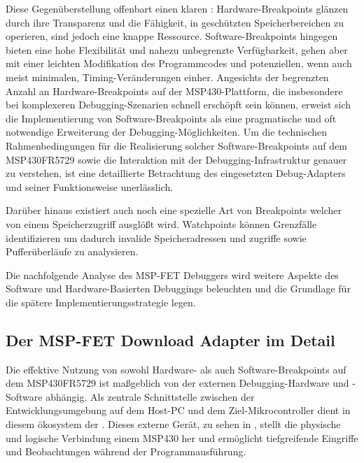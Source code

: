 Diese Gegen\"uberstellung offenbart einen klaren : Hardware-Breakpoints gl\"anzen durch ihre Transparenz und die F\"ahigkeit, in gesch\"utzten Speicherbereichen zu operieren, sind jedoch eine knappe Ressource. Software-Breakpoints hingegen bieten eine hohe Flexibilit\"at und nahezu unbegrenzte Verf\"ugbarkeit, gehen aber mit einer leichten Modifikation des Programmcodes und potenziellen, wenn auch meist minimalen, Timing-Ver\"anderungen einher. Angesichts der begrenzten Anzahl an Hardware-Breakpoints auf der MSP430-Plattform, die insbesondere bei komplexeren Debugging-Szenarien schnell ersch\"opft sein k\"onnen, erweist sich die Implementierung von Software-Breakpoints als eine pragmatische und oft notwendige Erweiterung der Debugging-M\"oglichkeiten. Um die technischen Rahmenbedingungen f\"ur die Realisierung solcher Software-Breakpoints auf dem MSP430FR5729 sowie die Interaktion mit der Debugging-Infrastruktur genauer zu verstehen, ist eine detaillierte Betrachtung des eingesetzten Debug-Adapters und seiner Funktionsweise unerl\"asslich. 

\newpage
Dar\"uber hinaus existiert auch noch eine spezielle Art von Breakpoints welcher von einem Speicherzugriff ausgl\"o{\ss}t wird. Watchpoints k\"onnen Grenzf\"alle identifizieren um dadurch invalide Speicheradressen und zugriffe sowie Puffer\"uberl\"aufe zu analysieren. 

Die nachfolgende Analyse des MSP-FET Debuggers wird weitere Aspekte des Software und Hardware-Basierten Debuggings beleuchten und die Grundlage f\"ur die sp\"atere Implementierungsstrategie legen.\AI


\subsection{Der MSP-FET Download Adapter im Detail}
\label{sec:MSP-FET_Debugger}

Die effektive Nutzung von sowohl Hardware- als auch Software-Breakpoints auf dem MSP430FR5729 ist ma{\ss}geblich von der externen Debugging-Hardware und -Software abh\"angig. Als zentrale Schnittstelle zwischen der Entwicklungsumgebung auf dem Host-PC und dem Ziel-Mikrocontroller dient in diesem \"okosystem der . Dieses externe Ger\"at, zu sehen in , stellt die physische und logische Verbindung einem MSP430 her und erm\"oglicht tiefgreifende Eingriffe und Beobachtungen w\"ahrend der Programmausf\"uhrung.

